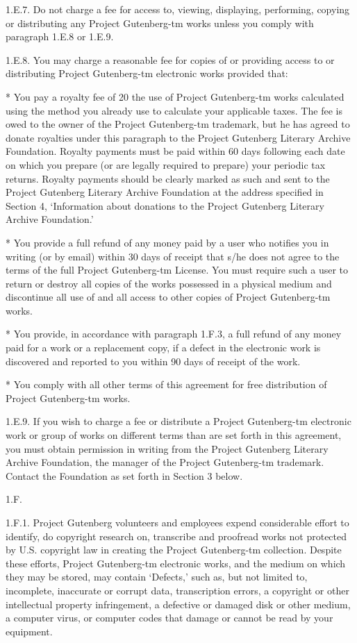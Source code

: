 \documentclass[oneside]{book}
\begin{document}
1.E.7. Do not charge a fee for access to, viewing, displaying,
performing, copying or distributing any Project Gutenberg-tm works
unless you comply with paragraph 1.E.8 or 1.E.9.

1.E.8. You may charge a reasonable fee for copies of or providing
access to or distributing Project Gutenberg-tm electronic works
provided that:

* You pay a royalty fee of 20%
  the use of Project Gutenberg-tm works calculated using the method
  you already use to calculate your applicable taxes. The fee is owed
  to the owner of the Project Gutenberg-tm trademark, but he has
  agreed to donate royalties under this paragraph to the Project
  Gutenberg Literary Archive Foundation. Royalty payments must be paid
  within 60 days following each date on which you prepare (or are
  legally required to prepare) your periodic tax returns. Royalty
  payments should be clearly marked as such and sent to the Project
  Gutenberg Literary Archive Foundation at the address specified in
  Section 4, `Information about donations to the Project Gutenberg
  Literary Archive Foundation.'

* You provide a full refund of any money paid by a user who notifies
  you in writing (or by email) within 30 days of receipt that s/he
  does not agree to the terms of the full Project Gutenberg-tm
  License. You must require such a user to return or destroy all
  copies of the works possessed in a physical medium and discontinue
  all use of and all access to other copies of Project Gutenberg-tm
  works.

* You provide, in accordance with paragraph 1.F.3, a full refund of
  any money paid for a work or a replacement copy, if a defect in the
  electronic work is discovered and reported to you within 90 days of
  receipt of the work.

* You comply with all other terms of this agreement for free
  distribution of Project Gutenberg-tm works.

1.E.9. If you wish to charge a fee or distribute a Project
Gutenberg-tm electronic work or group of works on different terms than
are set forth in this agreement, you must obtain permission in writing
from the Project Gutenberg Literary Archive Foundation, the manager of
the Project Gutenberg-tm trademark. Contact the Foundation as set
forth in Section 3 below.

1.F.

1.F.1. Project Gutenberg volunteers and employees expend considerable
effort to identify, do copyright research on, transcribe and proofread
works not protected by U.S. copyright law in creating the Project
Gutenberg-tm collection. Despite these efforts, Project Gutenberg-tm
electronic works, and the medium on which they may be stored, may
contain `Defects,' such as, but not limited to, incomplete, inaccurate
or corrupt data, transcription errors, a copyright or other
intellectual property infringement, a defective or damaged disk or
other medium, a computer virus, or computer codes that damage or
cannot be read by your equipment.
\end{document}
